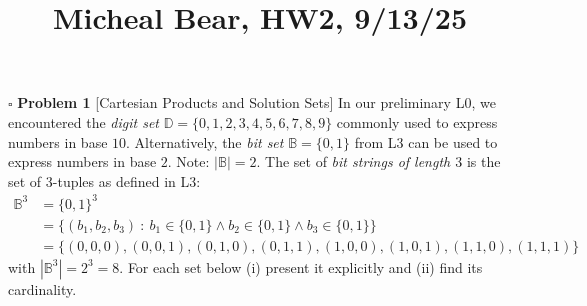 \documentclass[11pt,twoside]{amsart}
\title {Micheal Bear, HW2, 9/13/25}
\begin{document}
	\maketitle	


  \noindent $\square$ \textbf{Problem 1}  
  [\textsf{Cartesian Products and Solution Sets}] In our preliminary \textsf{L0}, we encountered the \textit{digit set} $\mathbb{D} = \{0,1,2,3,4,5,6,7,8,9\}$ commonly used to express numbers in base $10$. Alternatively, the \textit{bit set} $\mathbb{B} = \{0,1\}$ from \textsf{L3} can be used to express numbers in base $2$.  Note: $| \mathbb{B} | = 2$.  The set of \textit{bit strings of length $3$} is the set of  $3$-tuples as defined in \textsf{L3}: 
  \begin{align*} 
  \mathbb{B}^3 &= \{0,1\}^3 \nonumber \\ 
               &=\Big  \{ (b_1, b_2, b_3) \ :  \ b_1 \in \{0,1\}  \land b_2 \in \{0,1\} \land b_3 \in \{0,1\}\Big \} \nonumber \\ 
               &= \Big \{ (0,0,0), (0,0,1), (0,1,0),(0,1,1),(1,0,0),(1,0,1),(1,1,0),(1,1,1) \Big \} \nonumber
  \end{align*}  
with $| \mathbb{B}^3|=2^3=8$.  For each set below (i) present it explicitly and (ii) find its cardinality.
\end{document}
